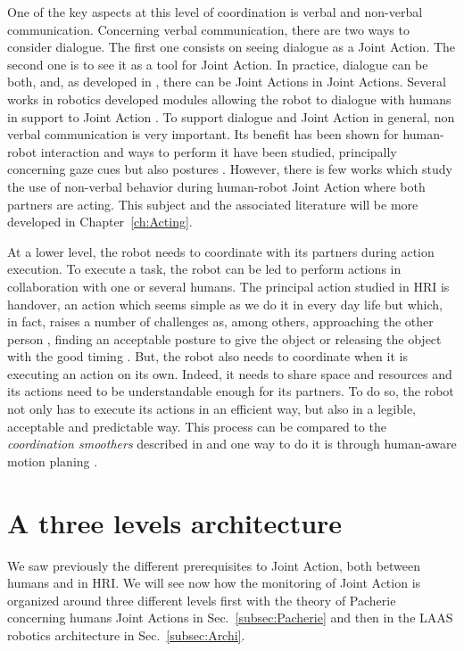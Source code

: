 \documentclass[english,a4paper,11pt,twoside]{StyleThese}
\begin{document}
One of the key aspects at this level of coordination is verbal and non-verbal communication. Concerning verbal communication, there are two ways to consider dialogue. The first one consists on seeing dialogue as a Joint Action. The second one is to see it as a tool for Joint Action. In practice, dialogue can be both, and, as developed in \cite{clark1996using}, there can be Joint Actions in Joint Actions. Several works in robotics developed modules allowing the robot to dialogue with humans in support to Joint Action \cite{roy2000spoken, lucignano2013dialogue, ferreira2015users}. To support dialogue and Joint Action in general, non verbal communication is very important. Its benefit has been shown for human-robot interaction \cite{breazeal2005effects} and ways to perform it have been studied, principally concerning gaze cues \cite{boucher2010facilitative, mutlu2009footing} but also postures \cite{hart2014gesture}. However, there is few works which study the use of non-verbal behavior during human-robot Joint Action where both partners are acting. This subject and the associated literature will be more developed in Chapter~\ref{ch:Acting}.

At a lower level, the robot needs to coordinate with its partners during action execution. To execute a task, the robot can be led to perform actions in collaboration with one or several humans. The principal action studied in HRI is handover, an action which seems simple as we do it in every day life but which, in fact, raises a number of challenges as, among others, approaching the other person \cite{walters2007robotic}, finding an acceptable posture to give the object \cite{cakmak2011human, mainprice2012sharing} or releasing the object with the good timing \cite{mason2005grip}. But, the robot also needs to coordinate when it is executing an action on its own. Indeed, it needs to share space and resources and its actions need to be understandable enough for its partners. To do so, the robot not only has to execute its actions in an efficient way, but also in a legible, acceptable and predictable way. This process can be compared to the \textit{coordination smoothers} described in \cite{vesper2010minimal} and one way to do it is through human-aware motion planing \cite{sisbot2012human, kruse2013human}.


\section{A three levels architecture}

We saw previously the different prerequisites to Joint Action, both between humans and in HRI. We will see now how the monitoring of Joint Action is organized around three different levels first with the theory of Pacherie concerning humans Joint Actions in Sec.~\ref{subsec:Pacherie} and then in the LAAS robotics architecture in Sec.~\ref{subsec:Archi}.
\end{document}
